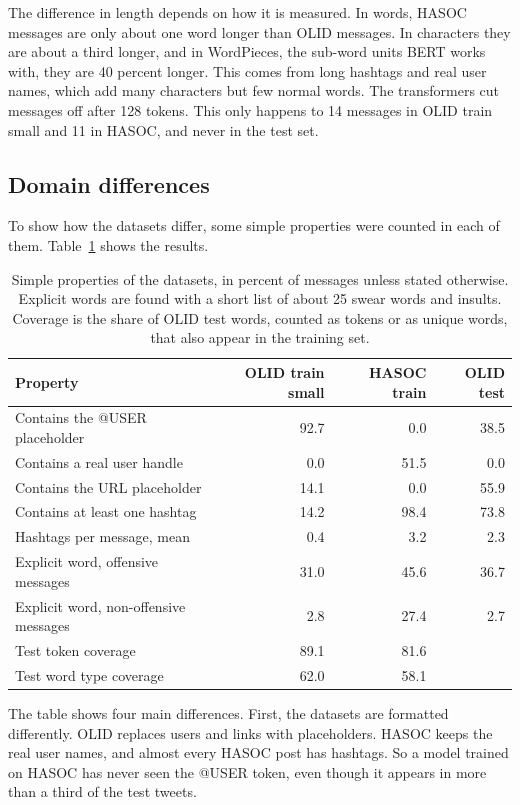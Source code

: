 \documentclass[11pt,a4paper]{article}
\begin{document}
The difference in length depends on how it is measured. In words, HASOC messages are only about one word longer than OLID messages. In characters they are about a third longer, and in WordPieces, the sub-word units BERT works with, they are 40 percent longer. This comes from long hashtags and real user names, which add many characters but few normal words. The transformers cut messages off after 128 tokens. This only happens to 14 messages in OLID train small and 11 in HASOC, and never in the test set.

\subsection{Domain differences}

To show how the datasets differ, some simple properties were counted in each of them. Table~\ref{tab:domain} shows the results.

\begin{table}[H]
\centering
\caption{Simple properties of the datasets, in percent of messages unless stated otherwise. Explicit words are found with a short list of about 25 swear words and insults. Coverage is the share of OLID test words, counted as tokens or as unique words, that also appear in the training set.}
\label{tab:domain}
\begin{tabular}{lrrr}
\toprule
Property & OLID train small & HASOC train & OLID test \\
\midrule
Contains the @USER placeholder & 92.7 & 0.0 & 38.5 \\
Contains a real user handle & 0.0 & 51.5 & 0.0 \\
Contains the URL placeholder & 14.1 & 0.0 & 55.9 \\
Contains at least one hashtag & 14.2 & 98.4 & 73.8 \\
Hashtags per message, mean & 0.4 & 3.2 & 2.3 \\
Explicit word, offensive messages & 31.0 & 45.6 & 36.7 \\
Explicit word, non-offensive messages & 2.8 & 27.4 & 2.7 \\
Test token coverage & 89.1 & 81.6 & \\
Test word type coverage & 62.0 & 58.1 & \\
\bottomrule
\end{tabular}
\end{table}

The table shows four main differences. First, the datasets are formatted differently. OLID replaces users and links with placeholders. HASOC keeps the real user names, and almost every HASOC post has hashtags. So a model trained on HASOC has never seen the @USER token, even though it appears in more than a third of the test tweets.
\end{document}

